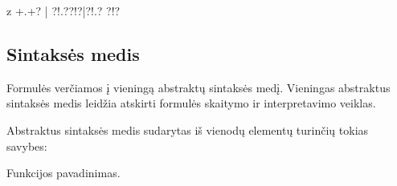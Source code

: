 \documentclass[letterpaper,10pt,lithuanian]{sphinxmanual}
\begin{document}
\begin{sphinxVerbatim}[commandchars=\\\{\}]
\PYGZti{}\PYG{p}{[}z\PYGZus{}\PYG{p}{]}\PYG{p}{[}\PYGZus{}\PYG{p}{]}
\PYGZti{}\PYGZbs{}+\PYGZbs{}.\PYGZbs{}+?
\PYGZti{}|\PYG{p}{[}\PYGZhy{}\PYG{p}{]}\PYGZbs{}
\PYGZti{}?!.??\PYGZlt{}!\PYGZbs{}\PYGZbs{}\PYGZbs{}\PYGZbs{}\PYGZbs{}\PYGZbs{}?\PYGZdq{}|\PYGZsq{}?!\PYGZsq{}\PYGZsq{}.?
?\PYGZlt{}!\PYGZbs{}\PYGZbs{}\PYGZbs{}\PYGZbs{}\PYGZbs{}\PYGZbs{}?\PYGZsq{}
\end{sphinxVerbatim}


\subsection{Sintaksės medis}
\label{\detokenize{formules:sintakses-medis}}
\sphinxAtStartPar
Formulės verčiamos į vieningą abstraktų sintaksės medį. Vieningas abstraktus
sintaksės medis leidžia atskirti formulės skaitymo ir interpretavimo veiklas.

\sphinxAtStartPar
Abstraktus sintaksės medis sudarytas iš vienodų elementų turinčių tokias
savybes:


\begin{fulllineitems}

\pysigstartsignatures
\pysigline
{}
\pysigstopsignatures
\sphinxAtStartPar
Funkcijos pavadinimas.

\end{fulllineitems}
\end{document}
